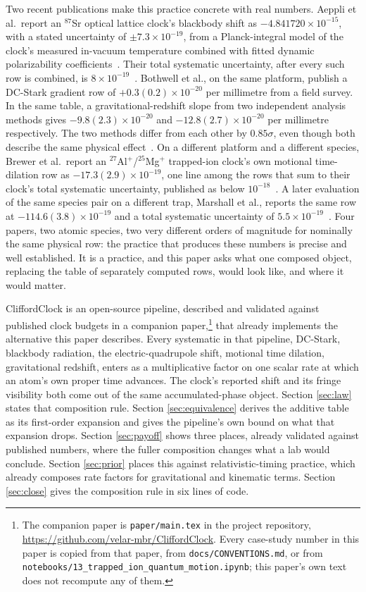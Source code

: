 \documentclass[aps,pra,superscriptaddress,groupedaddress,nofootinbib]{revtex4-2}
\begin{document}
Two recent publications make this practice concrete with real numbers.
Aeppli et al.\ report an $^{87}$Sr optical lattice clock's blackbody
shift as $-4.841720\times10^{-15}$, with a stated uncertainty of
$\pm7.3\times10^{-19}$, from a Planck-integral model of the clock's
measured in-vacuum temperature combined with fitted dynamic
polarizability coefficients~\cite{Aeppli2024}. Their total systematic
uncertainty, after every such row is combined, is
$8\times10^{-19}$~\cite{Aeppli2024}. Bothwell et al., on the same
platform, publish a DC-Stark gradient row of
$+0.3(0.2)\times10^{-20}$ per millimetre from a field survey. In
the same table, a gravitational-redshift slope from two independent
analysis methods gives $-9.8(2.3)\times10^{-20}$ and
$-12.8(2.7)\times10^{-20}$ per millimetre respectively. The two
methods differ from each other by $0.85\sigma$, even though both
describe the same physical effect~\cite{Bothwell2022}. On a different
platform and a different species, Brewer et al.\ report an
$^{27}$Al$^+$/$^{25}$Mg$^+$ trapped-ion clock's own motional
time-dilation row as $-17.3(2.9)\times10^{-19}$, one line among the
rows that sum to their clock's total systematic uncertainty, published
as below $10^{-18}$~\cite{Brewer2019}. A later evaluation of the same
species pair on a different trap, Marshall et al., reports the same
row at $-114.6(3.8)\times10^{-19}$ and a total systematic uncertainty
of $5.5\times10^{-19}$~\cite{Marshall2025}. Four papers, two atomic
species, two very different orders of magnitude for nominally the same
physical row: the practice that produces these numbers is precise and
well established. It is a practice, and this paper asks what one
composed object, replacing the table of separately computed rows,
would look like, and where it would matter.

CliffordClock is an open-source pipeline, described and validated
against published clock budgets in a companion
paper,\footnote{The companion paper is \texttt{paper/main.tex} in the
project repository, \url{https://github.com/velar-mbr/CliffordClock}.
Every case-study number in this paper is copied from that paper, from
\texttt{docs/CONVENTIONS.md}, or from
\texttt{notebooks/13\_trapped\_ion\_quantum\_motion.ipynb}; this
paper's own text does not recompute any of them.} that already implements the alternative this paper
describes. Every systematic in that pipeline, DC-Stark, blackbody
radiation, the electric-quadrupole shift, motional time dilation,
gravitational redshift, enters as a multiplicative factor on one
scalar rate at which an atom's own proper time advances. The
clock's reported shift and its fringe visibility both come out of the
same accumulated-phase object. Section
\ref{sec:law} states that composition rule. Section
\ref{sec:equivalence} derives the additive table as its first-order
expansion and gives the pipeline's own bound on what that expansion
drops. Section \ref{sec:payoff} shows three places, already validated
against published numbers, where the fuller composition changes what
a lab would conclude. Section \ref{sec:prior} places this against
relativistic-timing practice, which already composes rate factors for
gravitational and kinematic terms. Section \ref{sec:close} gives the
composition rule in six lines of code.
\end{document}
